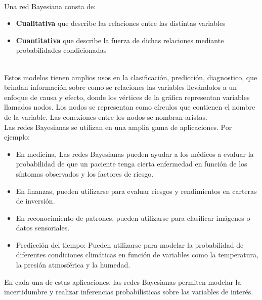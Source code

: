 \\ 

Una red Bayesiana consta de:
\begin{itemize} 
    \item \textbf{Cualitativa} que describe las relaciones entre las distintas variables
    \item \textbf{Cuantitativa} que describe la fuerza de dichas relaciones mediante probabilidades condicionadas
\end{itemize}

\\

Estos modelos tienen amplios usos en la clasificación, predicción, diagnostico, que brindan información sobre como se relaciones las variables llevándolos a un enfoque de causa y efecto, donde los vértices de la gráfica representan variables llamados nodos. Los nodos se representan como círculos que contienen el nombre de la variable. Las conexiones entre los nodos se nombran aristas.
\\

Las redes Bayesianas se utilizan en una amplia gama de aplicaciones. Por ejemplo:

\begin{itemize}
    \item  En medicina, Las redes Bayesianas pueden ayudar a los médicos a evaluar la probabilidad de que un paciente tenga cierta enfermedad en función de los síntomas observados y los factores de riesgo.
    \item En finanzas, pueden utilizarse para evaluar riesgos y rendimientos en carteras de inversión.
    \item En reconocimiento de patrones, pueden utilizarse para clasificar imágenes o datos sensoriales.

    \item Predicción del tiempo: Pueden utilizarse para modelar la probabilidad de diferentes condiciones climáticas en función de variables como la temperatura, la presión atmosférica y la humedad.

\end{itemize}
En cada una de estas aplicaciones, las redes Bayesianas permiten modelar la incertidumbre y realizar inferencias probabilísticas sobre las variables de interés.

